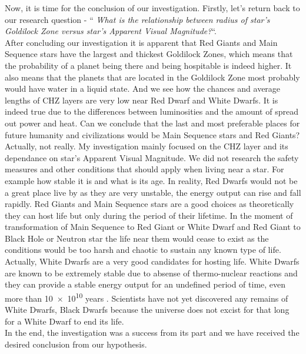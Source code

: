 \documentclass{article}
\begin{document}
Now, it is time for the conclusion of our investigation. Firstly, let's return back to our research question - `` \textit{What is the relationship between radius of star's Goldilock Zone versus star's Apparent Visual Magnitude?}``.\\

After concluding our investigation it is apparent that Red Giants and Main Sequence stars have the largest and thickest Goldilock Zones, which means that the probability of a planet being there and being hospitable is indeed higher. It also means that the planets that are located in the Goldilock Zone most probably would have water in a liquid state. And we see how the chances and average lengths of CHZ layers are very low near Red Dwarf and White Dwarfs. It is indeed true due to the differences between luminosities and the amount of spread out power and heat. Can we conclude that the last and most preferable places for future humanity and civilizations would be Main Sequence stars and Red Giants?\\

Actually, not really. My investigation mainly focused on the CHZ layer and its dependance on star's Apparent Visual Magnitude. We did not research the safety measures and other conditions that should apply when living near a star. For example how stable it is and what is its age. In reality, Red Dwarfs would not be a great place live by as they are very unstable, the energy output can rise and fall rapidly. Red Giants and Main Sequence stars are a good choices as theoretically they can host life but only during the period of their lifetime. In the moment of transformation of Main Sequence to Red Giant or White Dwarf and Red Giant to Black Hole or Neutron star the life near them would cease to exist as the conditions would be too harsh and chaotic to sustain any known type of life. Actually, White Dwarfs are a very good candidates for hosting life. White Dwarfs are known to be extremely stable due to absense of thermo-nuclear reactions and they can provide a stable energy output for an undefined period of time, even more than \num{10e+10} years \cite{wdlife}. Scientists have not yet discovered any remains of White Dwarfs, Black Dwarfs because the universe does not excist for that long for a White Dwarf to end its life.\\

In the end, the investigation was a success from its part and we have received the desired conclusion from our hypothesis.\\

\newpage


  
\end{document}
